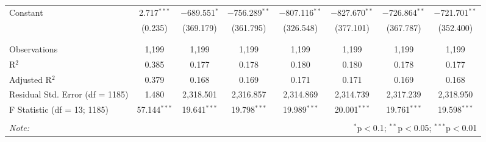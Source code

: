 \begin{table}[!htbp]
\begin{tabular}{@{\extracolsep{5pt}}lccccccc}
 Constant & 2.717$^{***}$ & $-$689.551$^{*}$ & $-$756.289$^{**}$ & $-$807.116$^{**}$ & $-$827.670$^{**}$ & $-$726.864$^{**}$ & $-$721.701$^{**}$ \\ 
  & (0.235) & (369.179) & (361.795) & (326.548) & (377.101) & (367.787) & (352.400) \\ 
  & & & & & & & \\ 
\hline \\[-1.8ex] 
Observations & 1,199 & 1,199 & 1,199 & 1,199 & 1,199 & 1,199 & 1,199 \\ 
R$^{2}$ & 0.385 & 0.177 & 0.178 & 0.180 & 0.180 & 0.178 & 0.177 \\ 
Adjusted R$^{2}$ & 0.379 & 0.168 & 0.169 & 0.171 & 0.171 & 0.169 & 0.168 \\ 
Residual Std. Error (df = 1185) & 1.480 & 2,318.501 & 2,316.857 & 2,314.869 & 2,314.739 & 2,317.239 & 2,318.950 \\ 
F Statistic (df = 13; 1185) & 57.144$^{***}$ & 19.641$^{***}$ & 19.798$^{***}$ & 19.989$^{***}$ & 20.001$^{***}$ & 19.761$^{***}$ & 19.598$^{***}$ \\ 
\hline 
\hline \\[-1.8ex] 
\textit{Note:}  & \multicolumn{7}{r}{$^{*}$p$<$0.1; $^{**}$p$<$0.05; $^{***}$p$<$0.01} \\ 
\end{tabular} 
\end{table} 

